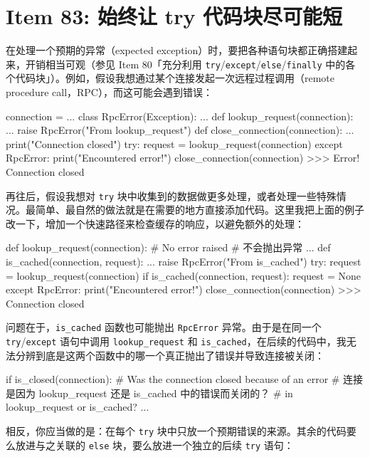 \section{Item 83: 始终让 try 代码块尽可能短}

在处理一个预期的异常（expected exception）时，要把各种语句块都正确搭建起来，开销相当可观（参见 Item 80「充分利用 \texttt{try}/\texttt{except}/\texttt{else}/\texttt{finally} 中的各个代码块」）。例如，假设我想通过某个连接发起一次远程过程调用（remote procedure call，RPC），而这可能会遇到错误：

\begin{codebox}[python]
connection = ...
class RpcError(Exception):
    ...
def lookup_request(connection):
    ...
    raise RpcError("From lookup_request")
def close_connection(connection):
    ...
    print("Connection closed")
try:
    request = lookup_request(connection)
except RpcError:
    print("Encountered error!")
    close_connection(connection)
>>>
Error!
Connection closed
\end{codebox}

再往后，假设我想对 \texttt{try} 块中收集到的数据做更多处理，或者处理一些特殊情况。最简单、最自然的做法就是在需要的地方直接添加代码。这里我把上面的例子改一下，增加一个快速路径来检查缓存的响应，以避免额外的处理：

\begin{codebox}[python]
def lookup_request(connection):
    # No error raised
    # 不会抛出异常
    ...
def is_cached(connection, request):
    ...
    raise RpcError("From is_cached")
try:
    request = lookup_request(connection)
    if is_cached(connection, request):
        request = None
except RpcError:
    print("Encountered error!")
    close_connection(connection)
>>>
Connection closed
\end{codebox}

问题在于，\texttt{is\_cached} 函数也可能抛出 \texttt{RpcError} 异常。由于是在同一个 \texttt{try}/\texttt{except} 语句中调用 \texttt{lookup\_request} 和 \texttt{is\_cached}，在后续的代码中，我无法分辨到底是这两个函数中的哪一个真正抛出了错误并导致连接被关闭：

\begin{codebox}[python]
if is_closed(connection):
    # Was the connection closed because of an error
    # 连接是因为 lookup_request 还是 is_cached 中的错误而关闭的？
    # in lookup_request or is_cached?
    ...
\end{codebox}

相反，你应当做的是：在每个 \texttt{try} 块中只放一个预期错误的来源。其余的代码要么放进与之关联的 \texttt{else} 块，要么放进一个独立的后续 \texttt{try} 语句：

